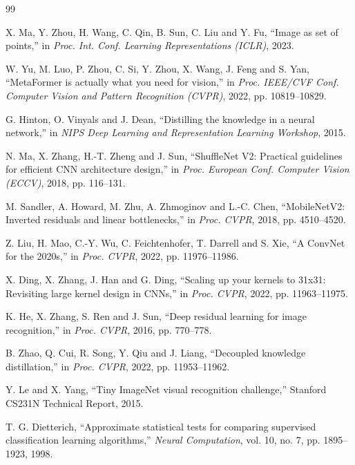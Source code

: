 \documentclass[9pt, conference, a4paper, compsocconf]{IEEEtran}
\begin{document}
\balance
\begin{thebibliography}{99}

 X. Ma, Y. Zhou, H. Wang, C. Qin, B. Sun, C. Liu and Y. Fu,
``Image as set of points,'' in \emph{Proc. Int. Conf. Learning
Representations (ICLR)}, 2023.

 W. Yu, M. Luo, P. Zhou, C. Si, Y. Zhou, X. Wang,
J. Feng and S. Yan, ``MetaFormer is actually what you need for vision,''
in \emph{Proc. IEEE/CVF Conf. Computer Vision and Pattern Recognition
(CVPR)}, 2022, pp. 10819--10829.

 G. Hinton, O. Vinyals and J. Dean, ``Distilling the
knowledge in a neural network,'' in \emph{NIPS Deep Learning and
Representation Learning Workshop}, 2015.

 N. Ma, X. Zhang, H.-T. Zheng and J. Sun,
``ShuffleNet V2: Practical guidelines for efficient CNN architecture
design,'' in \emph{Proc. European Conf. Computer Vision (ECCV)}, 2018,
pp. 116--131.

 M. Sandler, A. Howard, M. Zhu, A. Zhmoginov and
L.-C. Chen, ``MobileNetV2: Inverted residuals and linear bottlenecks,''
in \emph{Proc. CVPR}, 2018, pp. 4510--4520.

 Z. Liu, H. Mao, C.-Y. Wu, C. Feichtenhofer, T. Darrell
and S. Xie, ``A ConvNet for the 2020s,'' in \emph{Proc. CVPR}, 2022,
pp. 11976--11986.

 X. Ding, X. Zhang, J. Han and G. Ding, ``Scaling up your
kernels to 31x31: Revisiting large kernel design in CNNs,'' in
\emph{Proc. CVPR}, 2022, pp. 11963--11975.

 K. He, X. Zhang, S. Ren and J. Sun, ``Deep residual
learning for image recognition,'' in \emph{Proc. CVPR}, 2016, pp. 770--778.

 B. Zhao, Q. Cui, R. Song, Y. Qiu and J. Liang, ``Decoupled
knowledge distillation,'' in \emph{Proc. CVPR}, 2022, pp. 11953--11962.

 Y. Le and X. Yang, ``Tiny ImageNet visual
recognition challenge,'' Stanford CS231N Technical Report, 2015.

 T. G. Dietterich, ``Approximate statistical tests for
comparing supervised classification learning algorithms,''
\emph{Neural Computation}, vol. 10, no. 7, pp. 1895--1923, 1998.


\end{thebibliography}
\end{document}
